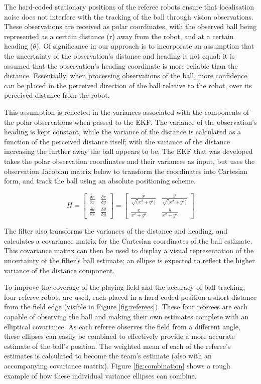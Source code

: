 \documentclass[runningheads,a4paper]{llncs}
\begin{document}
The hard-coded stationary positions of the referee robots ensure that localisation noise does not interfere with the tracking of the ball through vision observations. These observations are received as polar coordinates, with the observed ball being represented as a certain distance (r) away from the robot, and at a certain heading ($\theta$). Of significance in our approach is to incorporate an assumption that the uncertainty of the observation's distance and heading is not equal: it is assumed that the observation's heading coordinate is more reliable than the distance. Essentially, when processing observations of the ball, more confidence can be placed in the perceived direction of the ball relative to the robot, over its perceived distance from the robot.

This assumption is reflected in the variances associated with the components of the polar observations when passed to the EKF. The variance of the observation's heading is kept constant, while the variance of the distance is calculated as a function of the perceived distance itself; with the variance of the distance increasing the further away the ball appears to be. The EKF that was developed takes the polar observation coordinates and their variances as input, but uses the observation Jacobian matrix below to transform the coordinates into Cartesian form, and track the ball using an absolute positioning scheme.

\[
H = 
\left[ \begin{array}{cc}
\frac{\delta r}{\delta x}        &       \frac{\delta r}{\delta y}         \\
\frac{\delta \theta}{\delta x}   &       \frac{\delta \theta}{\delta y}    \end{array} \right]
=
\left[ \begin{array}{cc}
\frac{x}{\sqrt(x^2 + y^2)}        &       \frac{y}{\sqrt(x^2 + y^2)}         \\
\frac{x}{x^2 + y^2}   &       \frac{y}{x^2 + y^2}    \end{array} \right]
\] 

The filter also transforms the variances of the distance and heading, and calculates a covariance matrix for the Cartesian coordinates of the ball estimate. This covariance matrix can then be used to display a visual representation of the uncertainty of the filter's ball estimate; an ellipse is expected to reflect the higher variance of the distance component. 

To improve the coverage of the playing field and the accuracy of ball tracking, four referee robots are used, each placed in a hard-coded position a short distance from the field edge (visible in Figure \ref{fig:referees}). These four referees are each capable of observing the ball and making their own estimates complete with an elliptical covariance. As each referee observes the field from a different angle, these ellipses can easily be combined to effectively provide a more accurate estimate of the ball's position. The weighted mean of each of the referee's estimates is calculated to become the team's estimate (also with an accompanying covariance matrix). Figure \ref{fig:combination} shows a rough example of how these individual variance ellipses can combine. 
\end{document}
